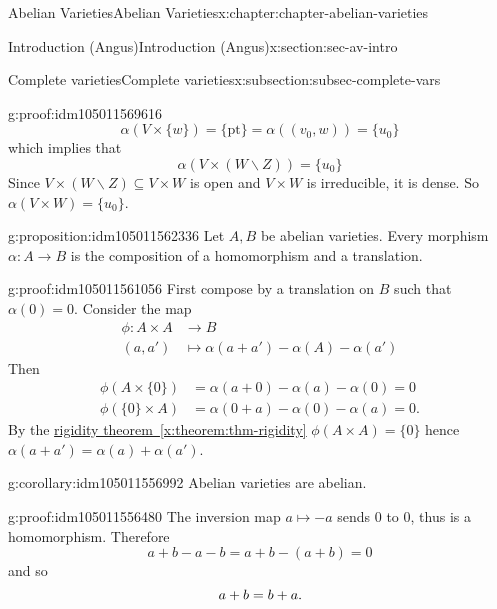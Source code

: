 \documentclass[oneside,10pt,]{book}
\newcommand{\qedhere}{\relax}
\numberwithin{equation}{section}
\newcommand{\amp}{&}
\begin{document}
\begin{chapterptx}{Abelian Varieties}{}{Abelian Varieties}{}{}{x:chapter:chapter-abelian-varieties}
\begin{sectionptx}{Introduction (Angus)}{}{Introduction (Angus)}{}{}{x:section:sec-av-intro}
\begin{subsectionptx}{Complete varieties}{}{Complete varieties}{}{}{x:subsection:subsec-complete-vars}
\begin{proofptx}{}{g:proof:idm105011569616}
\begin{equation*}
\alpha(V\times \{w\}) = \{\text{pt}\} = \alpha((v_0,w)) = \{u_0\}
\end{equation*}
which implies that%
\begin{equation*}
\alpha(V\times (W\smallsetminus Z)) = \{u_0\}
\end{equation*}
Since \(V\times (W\smallsetminus Z) \subseteq V\times W\) is open and \(V\times W\) is irreducible, it is dense. So \(\alpha(V\times W) = \{u_0\}\).%
\end{proofptx}
\begin{proposition}{}{}{g:proposition:idm105011562336}%
Let \(A,B\) be abelian varieties. Every morphism \(\alpha \colon A \to B \) is the composition of a homomorphism and a translation.%
\end{proposition}
\begin{proofptx}{}{g:proof:idm105011561056}
First compose by a translation on \(B\) such that \(\alpha(0) = 0\). Consider the map%
\begin{align*}
\phi \colon A\times A\amp\to B\\
(a,a')               \amp\mapsto \alpha(a+a') - \alpha(A) -\alpha(a')
\end{align*}
Then%
\begin{align*}
\phi(A\times\{0\}) \amp = \alpha(a+ 0) - \alpha(a) - \alpha(0) = 0\\
\phi(\{0\}\times A) \amp = \alpha(0+ a) - \alpha(0) - \alpha(a) = 0\text{.}
\end{align*}
By the \hyperref[x:theorem:thm-rigidity]{rigidity theorem~\ref{x:theorem:thm-rigidity}} \(\phi(A\times A) = \{0\}\) hence \(\alpha(a + a') = \alpha(a) + \alpha(a')\).%
\end{proofptx}
\begin{corollary}{}{}{g:corollary:idm105011556992}%
Abelian varieties are abelian.%
\end{corollary}
\begin{proofptx}{}{g:proof:idm105011556480}
The inversion map \(a \mapsto -a\) sends \(0\) to \(0\), thus is a homomorphism. Therefore%
\begin{equation*}
a+ b - a -b = a+b -(a+b) = 0
\end{equation*}
and so%
\begin{equation*}
a+b=b+a\text{.}\qedhere
\end{equation*}
%
\end{proofptx}
\end{subsectionptx}
\end{sectionptx}

\end{chapterptx}
\end{document}
